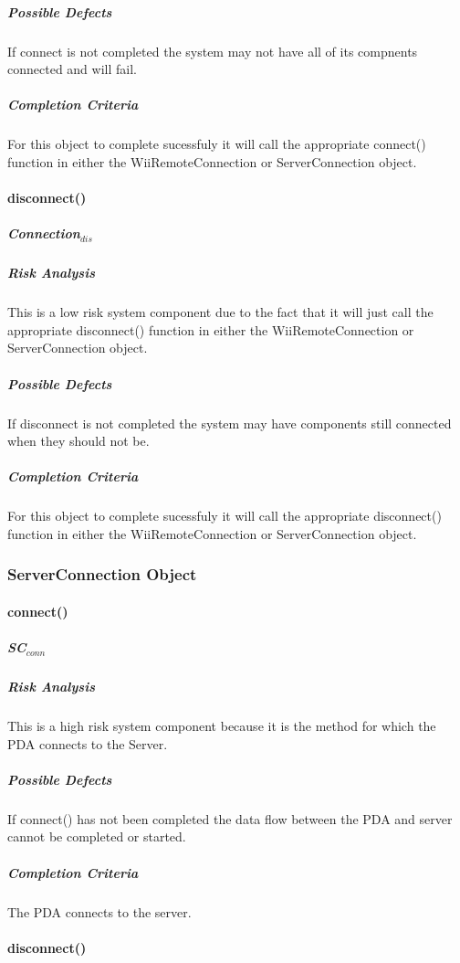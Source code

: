 \documentclass{article}
\begin{document}
\subparagraph{Possible Defects}
If connect is not completed the system may not have all of its compnents connected and will fail.

\subparagraph{Completion Criteria}
For this object to complete sucessfuly it will call the appropriate connect() function in either the WiiRemoteConnection or ServerConnection object.



\paragraph{disconnect()}

\subparagraph{Connection$_{dis}$}

\subparagraph{Risk Analysis}
This is a low risk system component due to the fact that it will just call the appropriate disconnect() function in either the WiiRemoteConnection or ServerConnection object.

\subparagraph{Possible Defects}
If disconnect is not completed the system may have components still connected when they should not be.

\subparagraph{Completion Criteria}
For this object to complete sucessfuly it will call the appropriate disconnect() function in either the WiiRemoteConnection or ServerConnection object.



\subsubsection{ServerConnection Object}

\paragraph{connect()}

\subparagraph{SC$_{conn}$}

\subparagraph{Risk Analysis}
This is a high risk system component because it is the method for which the PDA connects to the Server.

\subparagraph{Possible Defects}
If connect() has not been completed the data flow between the PDA and server cannot be completed or started.

\subparagraph{Completion Criteria}
The PDA connects to the server.


\paragraph{disconnect()}
\end{document}
